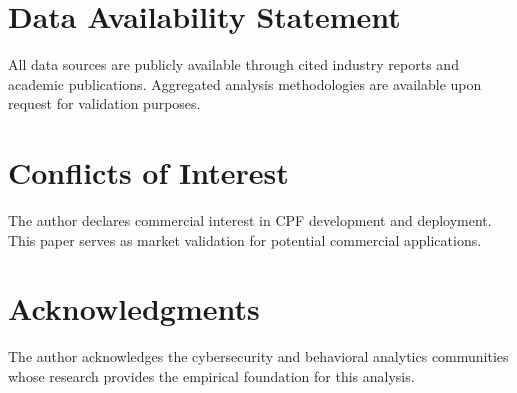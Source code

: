 \documentclass[11pt,a4paper]{article}
\begin{document}
\section*{Data Availability Statement}

All data sources are publicly available through cited industry reports and academic publications. Aggregated analysis methodologies are available upon request for validation purposes.

\section*{Conflicts of Interest}

The author declares commercial interest in CPF development and deployment. This paper serves as market validation for potential commercial applications.

\section*{Acknowledgments}

The author acknowledges the cybersecurity and behavioral analytics communities whose research provides the empirical foundation for this analysis.
\end{document}
